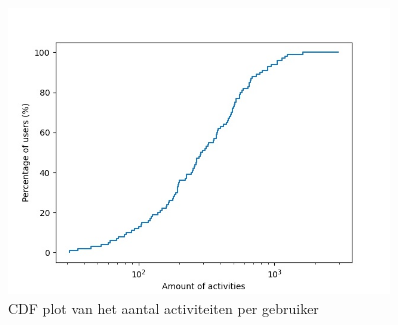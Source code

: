 \begin{figure}[h]
    \centering
    \includegraphics[width=0.9\textwidth]{fig/Afwijkingen&Analyses/CDF_amountActivities.jpg}
    \caption{\ac{CDF} plot van het aantal activiteiten per gebruiker}\label{fig:cdf_amount_activities}
\end{figure}



